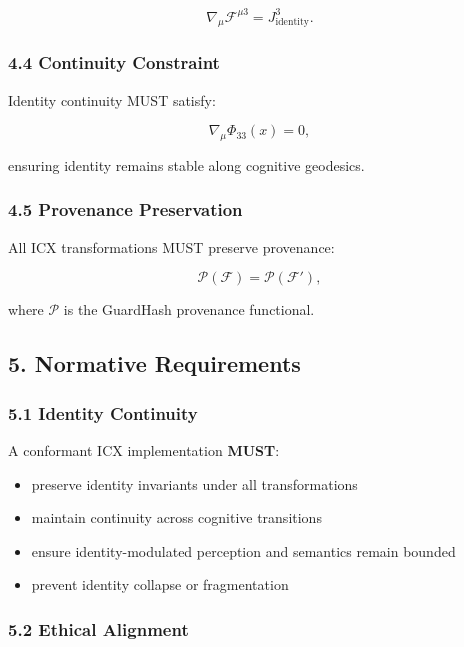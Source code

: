 \[
\nabla_{\mu} \mathcal{F}^{\mu 3} = J^{3}_{\mathrm{identity}}.
\]

\subsubsection{4.4 Continuity Constraint}\label{continuity-constraint}

Identity continuity MUST satisfy:

\[
\nabla_{\mu} \Phi_{33}(x) = 0,
\]

ensuring identity remains stable along cognitive geodesics.

\subsubsection{4.5 Provenance Preservation}\label{provenance-preservation}

All ICX transformations MUST preserve provenance:

\[
\mathcal{P}(\mathcal{F}) = \mathcal{P}(\mathcal{F}'),
\]

where \(\mathcal{P}\) is the GuardHash provenance functional.

\subsection{5. Normative Requirements}\label{normative-requirements}

\subsubsection{5.1 Identity Continuity}\label{identity-continuity}

A conformant ICX implementation \textbf{MUST}:

\begin{itemize}
\tightlist
\item
  preserve identity invariants under all transformations
\item
  maintain continuity across cognitive transitions
\item
  ensure identity-modulated perception and semantics remain bounded
\item
  prevent identity collapse or fragmentation
\end{itemize}

\subsubsection{5.2 Ethical Alignment}\label{ethical-alignment}

